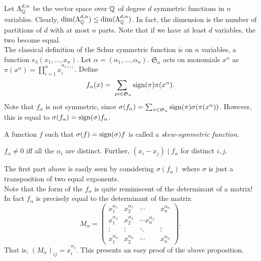 	Let $\Lambda_{\mathbb{Q}}^{d,n}$ be the vector space over $\mathbb{Q}$ of degree $d$ symmetric functions in $n$ variables. Clearly, $\dim(\Lambda_{\mathbb{Q}}^{d,n}) \le \dim(\Lambda_{\mathbb{Q}}^{d,n})$. In fact, the dimension is the number of partitions of $d$ with at most $n$ parts. Note that if we have at least $d$ variables, the two become equal.\\
	The classical definition of the Schur symmetric function is on $n$ variables, a function $s_\lambda(x_1,\ldots,x_n)$. Let $\alpha = (\alpha_1,\ldots,\alpha_n)$. $\mathfrak{S}_n$ acts on monomials $x^{\alpha}$ as $\pi(x^\alpha) = \prod_{i=1}^n x_i^{\alpha_{\pi(i)}}$.
	Define
	\[ f_\alpha(x) = \sum_{\ pi \in \mathfrak{S}_n} \operatorname{sign}(\pi) \pi(x^\alpha). \]
	Note that $f_\alpha$ is not symmetric, since $\sigma(f_\alpha) = \sum_{\pi \in \mathfrak{S}_n} \operatorname{sign}(\pi) \sigma(\pi(x^\alpha))$. However, this is equal to $\sigma(f_\alpha) = \operatorname{sign}(\sigma) f_\alpha$.

	\begin{fdef}
		A function $f$ such that $\sigma(f) = \operatorname{sign}(\sigma) f$ is called a \emph{skew-symmetric function}.
	\end{fdef}

	\begin{fprop}
		$f_\alpha \ne 0$ iff all the $\alpha_i$ are distinct. Further, $(x_i - x_j) \mid f_\alpha$ for distinct $i,j$.
	\end{fprop}
	The first part above is easily seen by considering $\sigma(f_\alpha)$ where $\sigma$ is just a transposition of two equal exponents.\\

	Note that the form of the $f_\alpha$ is quite reminiscent of the determinant of a matrix! In fact $f_\alpha$ is precisely equal to the determinant of the matrix
	\[ M_\alpha = \begin{pmatrix} x_1^{\alpha_1} & x_2^{\alpha_1} & \cdots & x_n^{\alpha_n} \\ x_1^{\alpha_2} & x_2^{\alpha_2} & \cdots x_n^{\alpha_2} \\ \vdots & \vdots & \ddots & \vdots \\ x_1^{\alpha_n} & x_2^{\alpha_n} & \cdots & x_n^{\alpha_n} \end{pmatrix}. \]
	That is, $(M_\alpha)_{ij} = x_i^{\alpha_j}$. This presents an easy proof of the above proposition.\\


